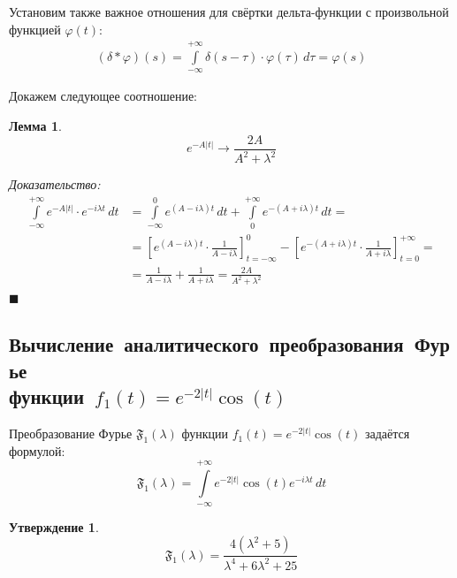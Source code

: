 \documentclass[11pt, oneside, draft]{article}
\numberwithin{equation}{section}
\newtheorem{lemma}[theorem]{Лемма}
\newtheorem*{statement}{Утверждение}
\renewenvironment{proof}{\noindent\textit{Доказательство: }} {\qed}
\newcommand \rarrow{\rightarrow}
\newcommand \intinf[1][{\,dt}]{ \int\limits_{-\infty}^{+\infty}{{#1}}}
\renewcommand \qed{$\blacksquare$}
\begin{document}
		{
		Установим также важное отношения для свёртки дельта-функции с произвольной функцией \(\varphi(t)\):
		\begin{align}
		\label{delta:conv}\boxed{\left(\delta * \varphi \right) (s) = \intinf[{\delta(s - \tau) \cdot \varphi(\tau)\, d\tau} = \varphi(s)]}
		\end{align}
		}
		
		\noindent Докажем следующее соотношение:
		\begin{lemma}
		\begin{equation}\label{fourier:exp_abs}
		e^{-A|t|} \rarrow \dfrac{2A}{A^2 + \lambda^2}
		\end{equation}
		\end{lemma}
		\begin{proof}
		\[
		\begin{split} 
			\intinf[{e^{-A|t|} \cdot e^{-i\lambda t} \, dt}] &= \int\limits_{-\infty}^0{e^{(A - i\lambda) t} \, dt} +  \int\limits_0^{+\infty}{e^{-(A + i\lambda) t} \, dt} = \\
			&= \left[ e^{(A - i\lambda)t} \cdot \frac{1}{A - i\lambda} \right]_{t = -\infty}^{0} 
			- \left[ e^{-(A + i\lambda)t} \cdot \frac{1}{A + i\lambda} \right]_{t = 0}^{+\infty} = \\ 
			&=\frac{1}{A - i\lambda} + \frac{1}{A + i\lambda} = \frac{2A}{A^2 + \lambda^2}
		\end{split}
		\]
		\end{proof}
\subsection{Вычисление~аналитического~преобразования~Фурье\\функции~\(f_1(t) = e^{-2|t|} \cos(t)\)}

	Преобразование Фурье \( \mathfrak{F_1} (\lambda)\) функции \(f_1(t) = e^{-2|t|} \cos(t) \) задаётся формулой:
	\[
		\mathfrak{F_1} (\lambda) = \intinf[{e^{-2|t|} \cos(t) e^{-i\lambda t}\, dt}]
	\]
	
	\begin{statement}
	\begin{equation}\label{fourier_transform:f1}
	\boxed{
		\mathfrak{F_1}(\lambda) =  \dfrac{4(\lambda^2 + 5)}{\lambda^4 + 6\lambda^2 + 25}
	}
	\end{equation}
	\end{statement}
	
\end{document}
